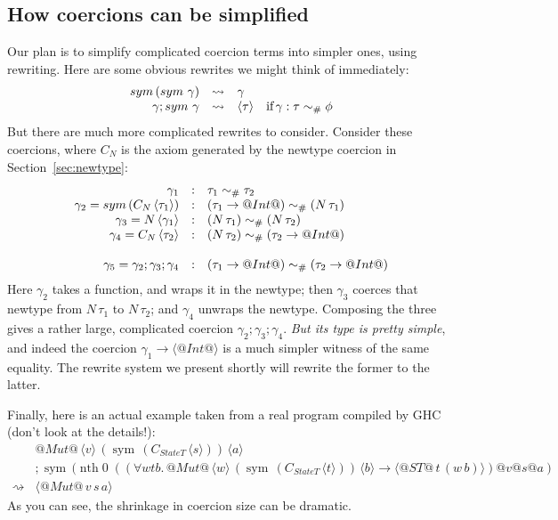 \documentclass[a4paper,UKenglish]{lipics}
\makeatletter
\newcommand{\psim}{\mathrel{\sim_{\tiny \#}}}
\newcommand{\sym}[1]{\mathop{sym}\, #1}
\newcommand{\nth}[2]{\mathop{nth} #1\;#2}
\newcommand{\inst}[2]{#1@#2}
\newcommand{\refl}[1]{\langle#1\rangle}  %
\newcommand{\rsa}[1]{\rightsquigarrow_{#1}}
\makeatother
\begin{document}
\subsection{How coercions can be simplified}

Our plan is to simplify complicated coercion terms into simpler ones, using rewriting. 
Here are some obvious rewrites we might think of immediately:
$$
\begin{array}{rcll}
\sym{(\sym{\gamma})} & \rsa{} & \gamma \\
\gamma ; \sym{\gamma} & \rsa{} & \refl{\tau} & \text{if}\,\gamma : \tau \psim \phi 
\end{array}
$$
But there are much more complicated rewrites to consider.
Consider these coercions, where $C_N$ is the axiom generated by the newtype coercion in 
Section~\ref{sec:newtype}:
$$
\begin{array}{rcl}
\gamma_1 & : & \tau_1 \psim \tau_2 \\
\gamma_2 = \sym{(C_N\,\refl{\tau_1})} & : & (\tau_1 \rightarrow @Int@) \psim (N\,\tau_1) \\
\gamma_3 = N\,\refl{\gamma_1} & : & (N\,\tau_1) \psim (N\,\tau_2) \\
\gamma_4 = C_N\,\refl{\tau_2} & : & (N\,\tau_2) \psim (\tau_2 \rightarrow @Int@) \\
\\
\gamma_5 = \gamma_2 ; \gamma_3 ; \gamma_4 & : & (\tau_1 \rightarrow @Int@) \psim (\tau_2 \rightarrow @Int@)
\end{array}
$$
Here $\gamma_2$ takes a function, and wraps it in the newtype; then $\gamma_3$ coerces that newtype from
$N\,\tau_1$ to $N\,\tau_2$; and $\gamma_4$ unwraps the newtype.
Composing the three gives a rather large, complicated 
coercion $\gamma_2 ; \gamma_3 ; \gamma_4$.  \emph{But its type
is pretty simple}, and indeed the coercion $\gamma_1 \to \refl{@Int@}$ is a much simpler
witness of the same equality.  The rewrite system we present shortly will rewrite 
the former to the latter.

Finally, here is an actual example taken from a real program compiled by GHC
(don't look at the details!):
$$
\begin{array}{ll}
& @Mut@\, \refl{v}\, (\sym{(C_{StateT} \, \refl{s})})\, \refl{a} \\
& ; \sym{(\nth{0}{(\inst{\inst{\inst{(\forall 
    w %
    t %
    b %
.\,
                   @Mut@\, \refl{w}\, (\sym{(C_{StateT}\, \refl{t})})\, \refl{b}
                   \rightarrow \refl{@ST@\, t\,(w\, b)})}{v}}{s}}{a})}} \\
\rsa{} & \refl{@Mut@\, v\,s\,a}
\end{array}
$$
As you can see, the shrinkage in coercion size can be dramatic.
\end{document}
